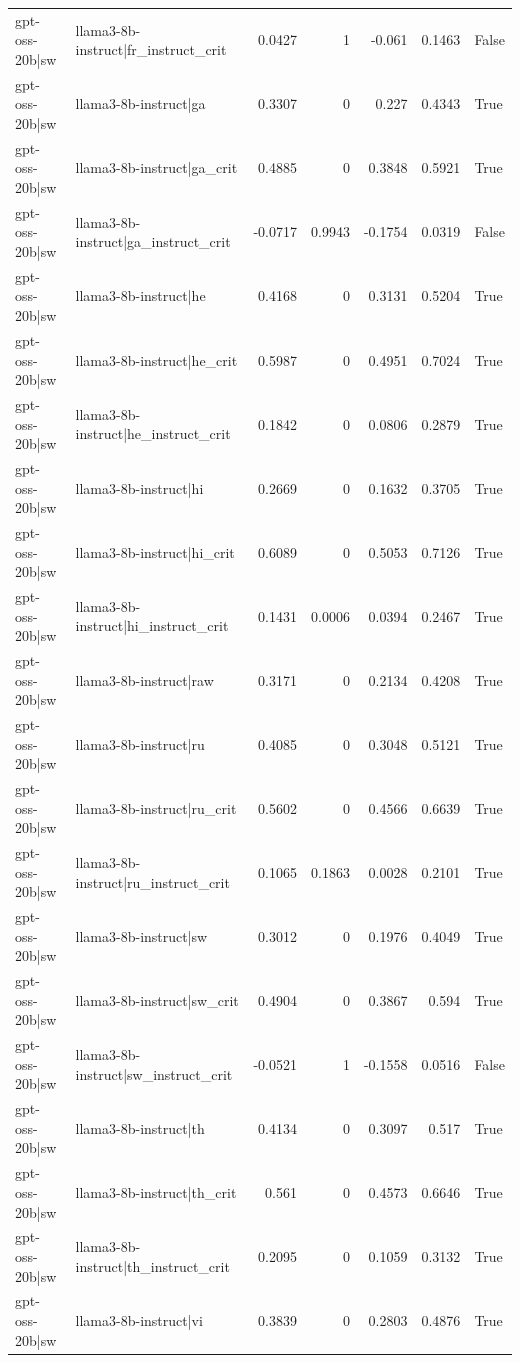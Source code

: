 \begin{table}
\begin{tabular}{l l r r r r l}
gpt-oss-20b|sw & llama3-8b-instruct|fr_instruct_crit & 0.0427 & 1 & -0.061 & 0.1463 & False \\
gpt-oss-20b|sw & llama3-8b-instruct|ga & 0.3307 & 0 & 0.227 & 0.4343 & True \\
gpt-oss-20b|sw & llama3-8b-instruct|ga_crit & 0.4885 & 0 & 0.3848 & 0.5921 & True \\
gpt-oss-20b|sw & llama3-8b-instruct|ga_instruct_crit & -0.0717 & 0.9943 & -0.1754 & 0.0319 & False \\
gpt-oss-20b|sw & llama3-8b-instruct|he & 0.4168 & 0 & 0.3131 & 0.5204 & True \\
gpt-oss-20b|sw & llama3-8b-instruct|he_crit & 0.5987 & 0 & 0.4951 & 0.7024 & True \\
gpt-oss-20b|sw & llama3-8b-instruct|he_instruct_crit & 0.1842 & 0 & 0.0806 & 0.2879 & True \\
gpt-oss-20b|sw & llama3-8b-instruct|hi & 0.2669 & 0 & 0.1632 & 0.3705 & True \\
gpt-oss-20b|sw & llama3-8b-instruct|hi_crit & 0.6089 & 0 & 0.5053 & 0.7126 & True \\
gpt-oss-20b|sw & llama3-8b-instruct|hi_instruct_crit & 0.1431 & 0.0006 & 0.0394 & 0.2467 & True \\
gpt-oss-20b|sw & llama3-8b-instruct|raw & 0.3171 & 0 & 0.2134 & 0.4208 & True \\
gpt-oss-20b|sw & llama3-8b-instruct|ru & 0.4085 & 0 & 0.3048 & 0.5121 & True \\
gpt-oss-20b|sw & llama3-8b-instruct|ru_crit & 0.5602 & 0 & 0.4566 & 0.6639 & True \\
gpt-oss-20b|sw & llama3-8b-instruct|ru_instruct_crit & 0.1065 & 0.1863 & 0.0028 & 0.2101 & True \\
gpt-oss-20b|sw & llama3-8b-instruct|sw & 0.3012 & 0 & 0.1976 & 0.4049 & True \\
gpt-oss-20b|sw & llama3-8b-instruct|sw_crit & 0.4904 & 0 & 0.3867 & 0.594 & True \\
gpt-oss-20b|sw & llama3-8b-instruct|sw_instruct_crit & -0.0521 & 1 & -0.1558 & 0.0516 & False \\
gpt-oss-20b|sw & llama3-8b-instruct|th & 0.4134 & 0 & 0.3097 & 0.517 & True \\
gpt-oss-20b|sw & llama3-8b-instruct|th_crit & 0.561 & 0 & 0.4573 & 0.6646 & True \\
gpt-oss-20b|sw & llama3-8b-instruct|th_instruct_crit & 0.2095 & 0 & 0.1059 & 0.3132 & True \\
gpt-oss-20b|sw & llama3-8b-instruct|vi & 0.3839 & 0 & 0.2803 & 0.4876 & True \\

\end{tabular}
\end{table}
